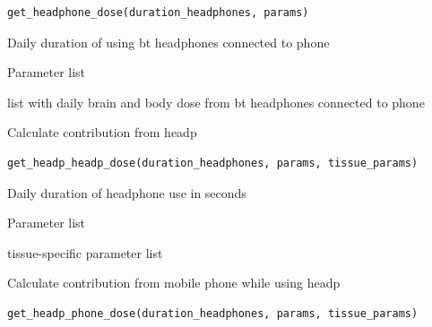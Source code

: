 \documentclass[a4paper]{book}
\begin{document}
%
\begin{Usage}
\begin{verbatim}
get_headphone_dose(duration_headphones, params)
\end{verbatim}
\end{Usage}
%
\begin{Arguments}
\begin{ldescription}
\item[\code{duration\_headphones}] Daily duration of using bt headphones connected to phone

\item[\code{params}] Parameter list
\end{ldescription}
\end{Arguments}
%
\begin{Value}
list with daily brain and body dose from bt headphones connected to phone
\end{Value}
%
\begin{Description}
Calculate contribution from headp
\end{Description}
%
\begin{Usage}
\begin{verbatim}
get_headp_headp_dose(duration_headphones, params, tissue_params)
\end{verbatim}
\end{Usage}
%
\begin{Arguments}
\begin{ldescription}
\item[\code{duration\_headphones}] Daily duration of headphone use in seconds

\item[\code{params}] Parameter list

\item[\code{tissue\_params}] tissue-specific parameter list
\end{ldescription}
\end{Arguments}
%
\begin{Description}
Calculate contribution from mobile phone while using headp
\end{Description}
%
\begin{Usage}
\begin{verbatim}
get_headp_phone_dose(duration_headphones, params, tissue_params)
\end{verbatim}
\end{Usage}
\end{document}
